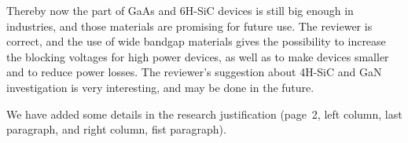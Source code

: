 \documentclass[10pt]{iopart}
\begin{document}
Thereby now the part of GaAs and 6H-SiC devices is still big enough in industries,
and those materials are promising for future use.
The reviewer is correct, and the use of wide bandgap materials gives the possibility to increase the blocking voltages for high
power devices, as well as to make devices smaller and to reduce power losses.
The reviewer’s suggestion about 4H-SiC and GaN investigation is very interesting, and may be done in the future.

We have added some details in the research justification
(page~2, left column, last paragraph, and right column, fist paragraph).




%
%
%
%
%
%
%
%
\end{document}

